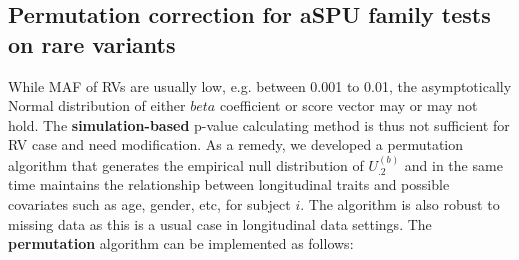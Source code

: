 \documentclass[12pt]{article}
\begin{document}
\subsection*{Permutation correction for aSPU family tests on rare variants}
While MAF of RVs are usually low, e.g. between 0.001 to 0.01, the asymptotically Normal distribution of either $beta$ coefficient or score vector may or may not hold. The \textbf{simulation-based} p-value calculating method is thus not sufficient for RV case and need modification. As a remedy, we developed a permutation algorithm that generates the empirical null distribution of $U_{.2}^{ (b) }$ and in the same time maintains the relationship between longitudinal traits and possible covariates such as age, gender, etc, for subject $i$. The algorithm is also robust to missing data as this is a usual case in longitudinal data settings. The \textbf{permutation} algorithm can be implemented as follows:
\end{document}
